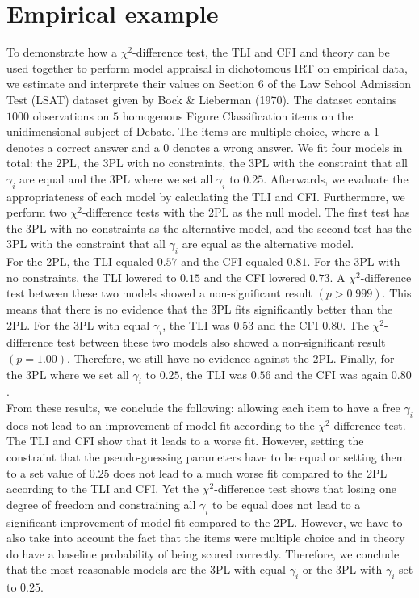 \documentclass[Royal,sageapa,times,doublespace]{sagej}
\begin{document}
\section{Empirical example}
To demonstrate how a $\chi^2$-difference test, the TLI and CFI and theory can be used together to perform model appraisal in dichotomous IRT on empirical data, we estimate and interprete their values on Section 6 of the Law School Admission Test (LSAT) dataset given by Bock \& Lieberman (1970). The dataset contains $1000$ observations on $5$ homogenous Figure Classification items on the unidimensional subject of Debate. The items are multiple choice, where a $1$ denotes a correct answer and a $0$ denotes a wrong answer. We fit four models in total: the 2PL, the 3PL with no constraints, the 3PL with the constraint that all $\gamma_i$ are equal and the 3PL where we set all $\gamma_i$ to $0.25$. Afterwards, we evaluate the appropriateness of each model by calculating the TLI and CFI. Furthermore, we perform two $\chi^2$-difference tests with the 2PL as the null model. The first test has the 3PL with no constraints as the alternative model, and the second test has the 3PL with the constraint that all $\gamma_i$ are equal as the alternative model. \\
\indent For the 2PL, the TLI equaled $0.57$ and the CFI equaled $0.81$. For the 3PL with no constraints, the TLI lowered to $0.15$ and the CFI lowered $0.73$. A $\chi^2$-difference test between these two models showed a non-significant result $(p > 0.999)$. This means that there is no evidence that the 3PL fits significantly better than the 2PL. For the 3PL with equal $\gamma_i$, the TLI was $0.53$ and the CFI $0.80$. The $\chi^2$-difference test between these two models also showed a non-significant result $(p = 1.00)$. Therefore, we still have no evidence against the 2PL. Finally, for the 3PL where we set all $\gamma_i$ to $0.25$, the TLI was $0.56$ and the CFI was again $0.80$. \\
\indent From these results, we conclude the following: allowing each item to have a free $\gamma_i$ does not lead to an improvement of model fit according to the $\chi^2$-difference test. The TLI and CFI show that it leads to a worse fit. However, setting the constraint that the pseudo-guessing parameters have to be equal or setting them to a set value of $0.25$ does not lead to a much worse fit compared to the 2PL according to the TLI and CFI. Yet the $\chi^2$-difference test shows that losing one degree of freedom and constraining all $\gamma_i$ to be equal does not lead to a significant improvement of model fit compared to the 2PL. However, we have to also take into account the fact that the items were multiple choice and in theory do have a baseline probability of being scored correctly. Therefore, we conclude that the most reasonable models are the 3PL with equal $\gamma_i$ or the 3PL with $\gamma_i$ set to $0.25$.
\end{document}
